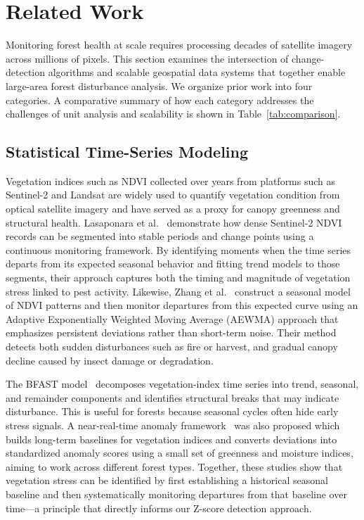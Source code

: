 \section{Related Work}

Monitoring forest health at scale requires processing decades of satellite imagery across millions of pixels. This section examines the intersection of change-detection algorithms and scalable geospatial data systems that together enable large-area forest disturbance analysis. We organize prior work into four categories. A comparative summary of how each category addresses the challenges of unit analysis and scalability is shown in Table~\ref{tab:comparison}.

\vspace{-10pt}
\subsection{Statistical Time-Series Modeling}

Vegetation indices such as NDVI collected over years from platforms such as Sentinel-2 and Landsat are widely used to quantify vegetation condition from optical satellite imagery and have served as a proxy for canopy greenness and structural health. Lasaponara et al.~\cite{lasaponara2024} demonstrate how dense Sentinel-2 NDVI records can be segmented into stable periods and change points using a continuous monitoring framework. By identifying moments when the time series departs from its expected seasonal behavior and fitting trend models to those segments, their approach captures both the timing and magnitude of vegetation stress linked to pest activity. Likewise, Zhang et al.~\cite{zhang_aewma2024} construct a seasonal model of NDVI patterns and then monitor departures from this expected curve using an Adaptive Exponentially Weighted Moving Average (AEWMA) approach that emphasizes persistent deviations rather than short-term noise. Their method detects both sudden disturbances such as fire or harvest, and gradual canopy decline caused by insect damage or degradation.

The BFAST model~\cite{kennedy2010} decomposes vegetation-index time series into trend, seasonal, and remainder components and identifies structural breaks that may indicate disturbance. This is useful for forests because seasonal cycles often hide early stress signals. A near-real-time anomaly framework~\cite{xie2025} was also proposed which builds long-term baselines for vegetation indices and converts deviations into standardized anomaly scores using a small set of greenness and moisture indices, aiming to work across different forest types. Together, these studies show that vegetation stress can be identified by first establishing a historical seasonal baseline and then systematically monitoring departures from that baseline over time—a principle that directly informs our Z-score detection approach.

